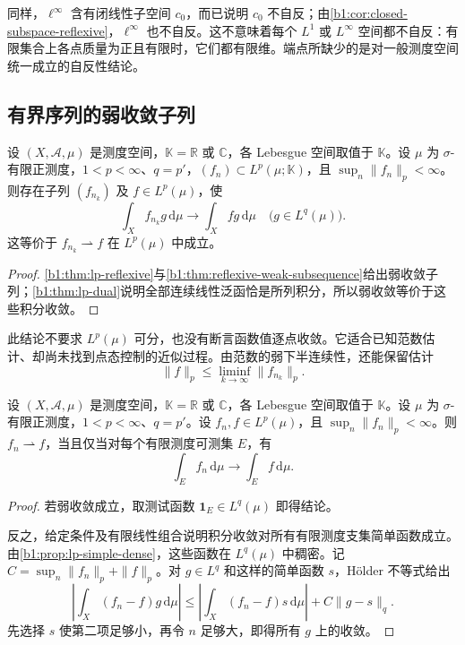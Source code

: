 \ProseParagraphBreak

同样，\(\ell^\infty\) 含有闭线性子空间 \(c_0\)，而已说明 \(c_0\) 不自反；由\cref{b1:cor:closed-subspace-reflexive}，\(\ell^\infty\) 也不自反。这不意味着每个 \(L^1\) 或 \(L^\infty\) 空间都不自反：有限集合上各点质量为正且有限时，它们都有限维。端点所缺少的是对一般测度空间统一成立的自反性结论。

\subsection{有界序列的弱收敛子列}
\label{b1:subsec:100402}

\begin{corollary}\label{b1:cor:lp-weak-subsequence}
设 \((X,\mathcal A,\mu)\) 是测度空间，\(\mathbb K=\mathbb R\) 或 \(\mathbb C\)，各 Lebesgue 空间取值于 \(\mathbb K\)。设 \(\mu\) 为 \(\sigma\)-有限正测度，\(1<p<\infty\)、\(q=p'\)，\((f_n)\subset L^p(\mu;\mathbb K)\)，且 \(\sup_n\|f_n\|_p<\infty\)。则存在子列 \((f_{n_k})\) 及 \(f\in L^p(\mu)\)，使
\[
 \int_X f_{n_k}g\,\mathrm d\mu
 \longrightarrow\int_Xfg\,\mathrm d\mu
 \quad\bigl(g\in L^q(\mu)\bigr).
\]
这等价于 \(f_{n_k}\rightharpoonup f\) 在 \(L^p(\mu)\) 中成立。
\end{corollary}
\begin{proof}
\cref{b1:thm:lp-reflexive}与\cref{b1:thm:reflexive-weak-subsequence}给出弱收敛子列；\cref{b1:thm:lp-dual}说明全部连续线性泛函恰是所列积分，所以弱收敛等价于这些积分收敛。
\end{proof}

此结论不要求 \(L^p(\mu)\) 可分，也没有断言函数值逐点收敛。它适合已知范数估计、却尚未找到点态控制的近似过程。由范数的弱下半连续性，还能保留估计
\[
 \|f\|_p\le\liminf_{k\to\infty}\|f_{n_k}\|_p.
\]

\begin{proposition}\label{b1:prop:lp-weak-finite-set-tests}
设 \((X,\mathcal A,\mu)\) 是测度空间，\(\mathbb K=\mathbb R\) 或 \(\mathbb C\)，各 Lebesgue 空间取值于 \(\mathbb K\)。设 \(\mu\) 为 \(\sigma\)-有限正测度，\(1<p<\infty\)、\(q=p'\)。设 \(f_n,f\in L^p(\mu)\)，且 \(\sup_n\|f_n\|_p<\infty\)。则 \(f_n\rightharpoonup f\)，当且仅当对每个有限测度可测集 \(E\)，有
\[
 \int_E f_n\,\mathrm d\mu\longrightarrow\int_E f\,\mathrm d\mu.
\]
\end{proposition}
\begin{proof}
若弱收敛成立，取测试函数 \(\mathbf1_E\in L^q(\mu)\) 即得结论。

反之，给定条件及有限线性组合说明积分收敛对所有有限测度支集简单函数成立。由\cref{b1:prop:lp-simple-dense}，这些函数在 \(L^q(\mu)\) 中稠密。记 \(C=\sup_n\|f_n\|_p+\|f\|_p\)。对 \(g\in L^q\) 和这样的简单函数 \(s\)，Hölder 不等式给出
\[
 \left|\int_X(f_n-f)g\,\mathrm d\mu\right|
 \le\left|\int_X(f_n-f)s\,\mathrm d\mu\right|
   +C\|g-s\|_q.
\]
先选择 \(s\) 使第二项足够小，再令 \(n\) 足够大，即得所有 \(g\) 上的收敛。
\end{proof}

